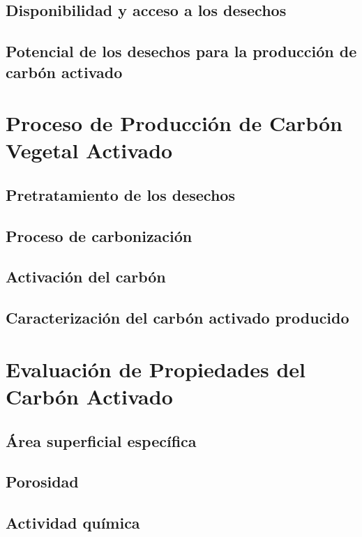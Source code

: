 \documentclass[12pt,a4paper,oneside]{book}
\begin{document}
\section{Disponibilidad y acceso a los desechos}

\section{Potencial de los desechos para la producción de carbón activado}

\chapter{Proceso de Producción de Carbón Vegetal Activado}

\section{Pretratamiento de los desechos}

\section{Proceso de carbonización}

\section{Activación del carbón}

\section{Caracterización del carbón activado producido}

\chapter{Evaluación de Propiedades del Carbón Activado}

\section{Área superficial específica}

\section{Porosidad}

\section{Actividad química}
\end{document}
